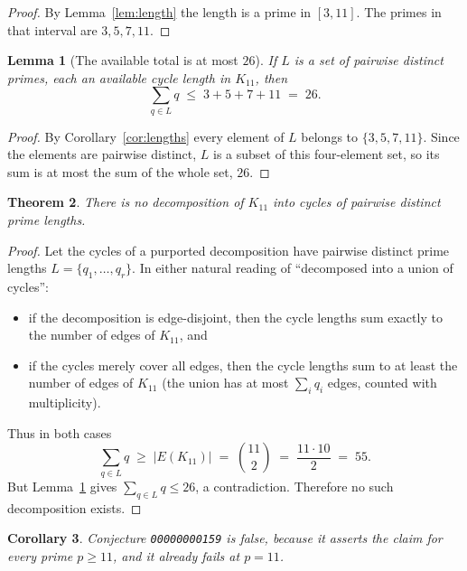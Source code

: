 \documentclass[11pt]{article}
\newtheorem{theorem}{Theorem}
\newtheorem{lemma}[theorem]{Lemma}
\newtheorem{corollary}[theorem]{Corollary}
\theoremstyle{definition}
\theoremstyle{remark}
\begin{document}
\begin{proof}
By Lemma~\ref{lem:length} the length is a prime in $[3,11]$. The primes in that
interval are $3,5,7,11$.
\end{proof}

\begin{lemma}[The available total is at most $26$]
\label{lem:sum}
If $L$ is a set of pairwise distinct primes, each an available cycle length in
$K_{11}$, then
\[
\sum_{q \in L} q \;\le\; 3 + 5 + 7 + 11 \;=\; 26 .
\]
\end{lemma}

\begin{proof}
By Corollary~\ref{cor:lengths} every element of $L$ belongs to
$\{3,5,7,11\}$. Since the elements are pairwise distinct, $L$ is a subset of
this four-element set, so its sum is at most the sum of the whole set, $26$.
\end{proof}

\begin{theorem}
\label{thm:main}
There is no decomposition of $K_{11}$ into cycles of pairwise distinct prime
lengths.
\end{theorem}

\begin{proof}
Let the cycles of a purported decomposition have pairwise distinct prime lengths
$L = \{q_1, \dots, q_r\}$. In either natural reading of ``decomposed into a
union of cycles'':

\begin{itemize}
\item if the decomposition is edge-disjoint, then the cycle lengths sum exactly
      to the number of edges of $K_{11}$, and
\item if the cycles merely cover all edges, then the cycle lengths sum to at
      least the number of edges of $K_{11}$ (the union has at most
      $\sum_i q_i$ edges, counted with multiplicity).
\end{itemize}

Thus in both cases
\[
\sum_{q \in L} q \;\ge\; \lvert E(K_{11}) \rvert \;=\; \binom{11}{2}
\;=\; \frac{11 \cdot 10}{2} \;=\; 55 .
\]
But Lemma~\ref{lem:sum} gives $\sum_{q\in L} q \le 26$, a contradiction.
Therefore no such decomposition exists.
\end{proof}

\begin{corollary}
Conjecture \texttt{00000000159} is false, because it asserts the claim for
\emph{every} prime $p \ge 11$, and it already fails at $p = 11$.
\end{corollary}
\end{document}
